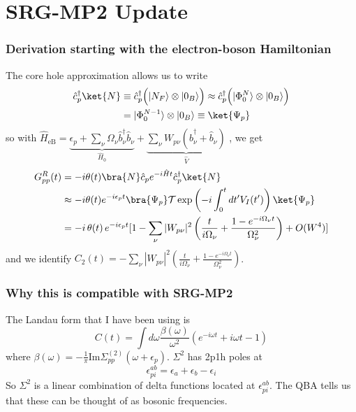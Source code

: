 \section{SRG-MP2 Update}
\begin{frame}
\frametitle{Derivation starting with the electron-boson Hamiltonian}
The core hole approximation allows us to write
\begin{align}
\hat{c}_p^\dagger \ket{N} &\equiv \hat{c}_p^\dagger \Bigl( |N_F\rangle \otimes |0_B\rangle \Bigr) \approx \hat{c}_p^\dagger \Bigl( |\Phi_0^N\rangle \otimes |0_B\rangle \Bigr)
\label{eq:core_hole_approx_1}\\
& = |\Phi_0^{N-1}\rangle \otimes |0_B\rangle
\equiv \ket{\Psi_p}
\end{align}
so with $
    \hat{H}_{\text{eB}} = \underbrace{\epsilon_{p} + \sum_{\nu} \Omega_{\nu} \hat{b}_\nu^\dagger \hat{b}_\nu}_{\hat{H}_0} + \underbrace{\sum_{\nu} W_{p\nu} \left( \hat{b}_\nu^\dagger + \hat{b}_\nu \right)}_{\hat{V}}$
, we get
\begin{align}
G_{pp}^R(t) &= -i \theta(t) \bra{N} \hat{c}_p e^{-i\hat{H} t} \hat{c}_p^\dagger \ket{N} \\
&\approx -i \theta(t) e^{-i\epsilon_p t} {\bra{\Psi_p}  \mathcal{T} \exp \left( -i \int_0^t dt' V_I(t') \right) \ket{\Psi_p}} \\
&=
-i\,\theta(t)\,e^{-i\epsilon_p t} [1-\sum_\nu |W_{p\nu}|^2\left(\frac{t}{i\Omega_\nu}+\frac{1-e^{-i\Omega_\nu t}}{\Omega_\nu^2}\right) + O(W^4)]
\end{align}
and we identify $C_2(t) = -\sum_\nu |W_{p\nu}|^2\left(\frac{t}{i\Omega_\nu}+\frac{1-e^{-i\Omega_\nu t}}{\Omega_\nu^2}\right)$.
\end{frame}
\begin{frame}
\frametitle{Why this is compatible with SRG-MP2}
The Landau form that I have been using is
\begin{equation}
C(t) = \int d\omega \frac{\beta(\omega)}{\omega^2} \left( e^{-i\omega t} + i\omega t - 1 \right)
\end{equation}
where $\beta(\omega) = -\frac{1}{\pi} \text{Im} \Sigma_{pp}^{(2)}(\omega + \epsilon_p)$. $\Sigma^2$ has 2p1h poles at
 \begin{equation} \epsilon_{pi}^{ab} = \epsilon_a + \epsilon_b - \epsilon_i\end{equation} So $\Sigma^2$ is a linear combination of delta functions located at $\epsilon_{pi}^{ab}$. The QBA tells us that these can be thought of as bosonic frequencies.


\end{frame}

